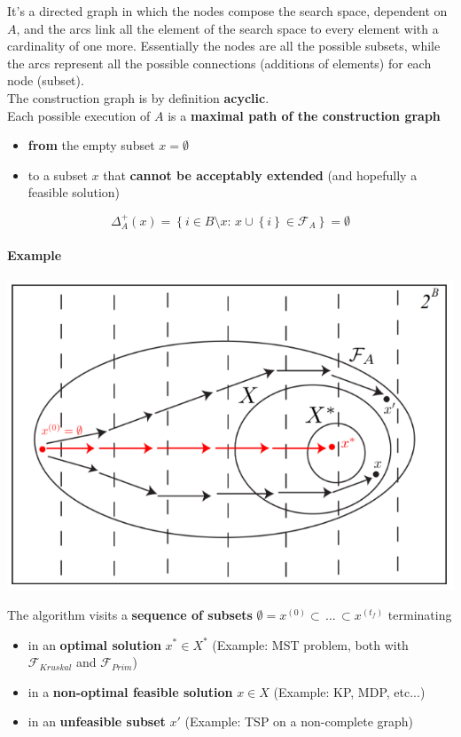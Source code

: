 It's a directed graph in which the nodes compose the search space, dependent on $A$, and the arcs link all the element of the search space to every element with a cardinality of one more. Essentially the nodes are all the possible subsets, while the arcs represent all the possible connections (additions of elements) for each node (subset).\\

The construction graph is by definition \textbf{acyclic}.\\

Each possible execution of $A$ is a \textbf{maximal path of the construction graph}
\begin{itemize}
	\item \textbf{from} the empty subset $x = \emptyset$
	\item to a subset $x$ that \textbf{cannot be acceptably extended} (and hopefully a feasible solution)
\end{itemize}
$$ \Delta^+_A (x) = \left\{i \in B \setminus x : \, x \cup \left\{i\right\} \in \mathcal{F}_A \right\} = \emptyset $$

\newpage

\paragraph{Example}
\begin{center}
	\includegraphics[width=0.8\columnwidth]{img/CGraph1}
\end{center}
The algorithm visits a \textbf{sequence of subsets} $\emptyset = x^{(0)} \subset \, ... \, \subset x^{(t_f)}$ terminating
\begin{itemize}
	\item in an \textbf{optimal solution} $x^\ast \in X^\ast$ (Example: MST problem, both with $\mathcal{F}_{Kruskal}$ and $\mathcal{F}_{Prim}$)
	\item in a \textbf{non-optimal feasible solution} $x \in X$ (Example: KP, MDP, etc...)
	\item in an \textbf{unfeasible subset} $x'$ (Example: TSP on a non-complete graph)
\end{itemize}

